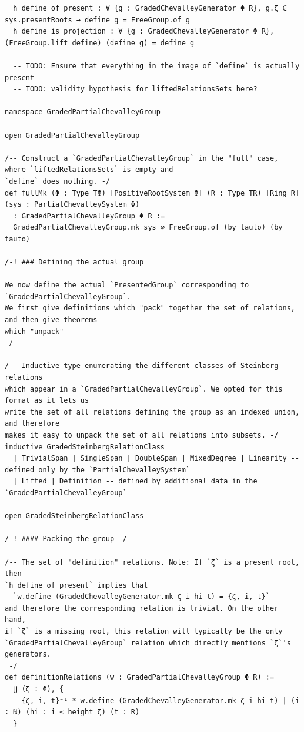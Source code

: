 \begin{Verbatim}
  h_define_of_present : ∀ {g : GradedChevalleyGenerator Φ R}, g.ζ ∈ sys.presentRoots → define g = FreeGroup.of g
  h_define_is_projection : ∀ {g : GradedChevalleyGenerator Φ R}, (FreeGroup.lift define) (define g) = define g

  -- TODO: Ensure that everything in the image of `define` is actually present
  -- TODO: validity hypothesis for liftedRelationsSets here?

namespace GradedPartialChevalleyGroup

open GradedPartialChevalleyGroup

/-- Construct a `GradedPartialChevalleyGroup` in the "full" case, where `liftedRelationsSets` is empty and
`define` does nothing. -/
def fullMk (Φ : Type TΦ) [PositiveRootSystem Φ] (R : Type TR) [Ring R] (sys : PartialChevalleySystem Φ)
  : GradedPartialChevalleyGroup Φ R :=
  GradedPartialChevalleyGroup.mk sys ∅ FreeGroup.of (by tauto) (by tauto)

/-! ### Defining the actual group

We now define the actual `PresentedGroup` corresponding to `GradedPartialChevalleyGroup`.
We first give definitions which "pack" together the set of relations, and then give theorems
which "unpack"
-/

/-- Inductive type enumerating the different classes of Steinberg relations
which appear in a `GradedPartialChevalleyGroup`. We opted for this format as it lets us
write the set of all relations defining the group as an indexed union, and therefore
makes it easy to unpack the set of all relations into subsets. -/
inductive GradedSteinbergRelationClass
  | TrivialSpan | SingleSpan | DoubleSpan | MixedDegree | Linearity -- defined only by the `PartialChevalleySystem`
  | Lifted | Definition -- defined by additional data in the `GradedPartialChevalleyGroup`

open GradedSteinbergRelationClass

/-! #### Packing the group -/

/-- The set of "definition" relations. Note: If `ζ` is a present root, then
`h_define_of_present` implies that
  `w.define (GradedChevalleyGenerator.mk ζ i hi t) = {ζ, i, t}`
and therefore the corresponding relation is trivial. On the other hand,
if `ζ` is a missing root, this relation will typically be the only
`GradedPartialChevalleyGroup` relation which directly mentions `ζ`'s generators.
 -/
def definitionRelations (w : GradedPartialChevalleyGroup Φ R) :=
  ⋃ (ζ : Φ), {
    {ζ, i, t}⁻¹ * w.define (GradedChevalleyGenerator.mk ζ i hi t) | (i : ℕ) (hi : i ≤ height ζ) (t : R)
  }


\end{Verbatim}
